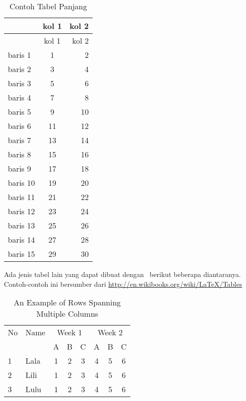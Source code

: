 \begin{longtable}{| l | c r |}
\caption{Contoh Tabel Panjang}
\label{tab:tab2} \\
\hline
& kol 1 & kol 2 \\
\hline
\endfirsthead %
\hline
& kol 1 & kol 2 \\
\hline
\endhead %
baris 1  & 1 & 2 \\
baris 2  & 3 & 4 \\
baris 3  & 5 & 6 \\
baris 4  & 7 & 8 \\
baris 5  & 9 & 10 \\
baris 6  & 11 & 12 \\
baris 7  & 13 & 14 \\
baris 8  & 15 & 16 \\
baris 9  & 17 & 18 \\
baris 10 & 19 & 20 \\
baris 11 & 21 & 22 \\
baris 12 & 23 & 24 \\
baris 13 & 25 & 26 \\
baris 14 & 27 & 28 \\
baris 15 & 29 & 30 \\
\hline
\end{longtable}

Ada jenis tabel lain yang dapat dibuat dengan \latex~berikut beberapa diantaranya.
Contoh-contoh ini bersumber dari \url{http://en.wikibooks.org/wiki/LaTeX/Tables}

\begin{table}
	\centering
	\caption{An Example of Rows Spanning Multiple Columns}
	\label{row.spanning}
	\begin{tabular}{|l|l|*{6}{c|}}
		\hline %
		No & Name & \multicolumn{3}{|c|}{Week 1} & \multicolumn{3}{|c|}{Week 2} \\
		\cline{3-8} %
		& & A & B & C & A & B & C\\
		\hline
		1 & Lala & 1 & 2 & 3 & 4 & 5 & 6\\
		2 & Lili & 1 & 2 & 3 & 4 & 5 & 6\\
		3 & Lulu & 1 & 2 & 3 & 4 & 5 & 6\\
		\hline
	\end{tabular}
\end{table}

